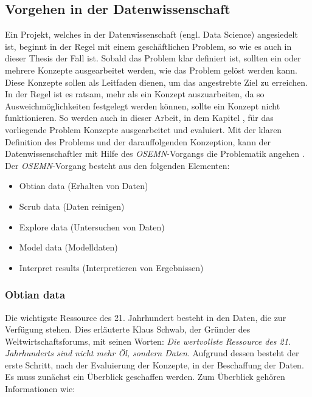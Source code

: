 \subsection{Vorgehen in der Datenwissenschaft}
\label{subsec:ds_vorgehen}
Ein Projekt, welches in der Datenwissenschaft (engl. Data Science) angesiedelt ist, beginnt in der Regel mit einem geschäftlichen Problem, so wie es auch in dieser Thesis der Fall ist. Sobald das Problem klar definiert ist, sollten ein oder mehrere Konzepte ausgearbeitet werden, wie das Problem gelöst werden kann. Diese Konzepte sollen als Leitfaden dienen, um das angestrebte Ziel zu erreichen. In der Regel ist es ratsam, mehr als ein Konzept auszuarbeiten, da so Ausweichmöglichkeiten festgelegt werden können, sollte ein Konzept nicht funktionieren. So werden auch in dieser Arbeit, in dem Kapitel \emph{}, für das vorliegende Problem Konzepte ausgearbeitet und evaluiert. 
\newline
\newline
Mit der klaren Definition des Problems und der darauffolgenden Konzeption, kann der Datenwissenschaftler mit Hilfe des \emph{OSEMN}-Vorgangs die Problematik angehen \cite{Vorgehen_ds}. 
\newline
\newline
Der \emph{OSEMN}-Vorgang besteht aus den folgenden Elementen:

\begin{itemize}
    \item Obtian data (Erhalten von Daten)
    \item Scrub data (Daten reinigen)
    \item Explore data (Untersuchen von Daten)
    \item Model data (Modelldaten)
    \item Interpret results (Interpretieren von Ergebnissen)
\end{itemize}

\subsubsection{Obtian data}
Die wichtigste Ressource des 21. Jahrhundert besteht in den Daten, die zur Verfügung stehen. Dies erläuterte  Klaus Schwab, der Gründer des Weltwirtschaftsforums, mit seinen Worten: \emph{Die wertvollste Ressource des 21. Jahrhunderts sind nicht mehr Öl, sondern Daten}. Aufgrund dessen besteht der erste Schritt, nach der Evaluierung der Konzepte, in der Beschaffung der Daten. Es muss zunächst ein Überblick geschaffen werden. Zum Überblick gehören Informationen wie:

